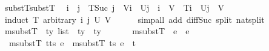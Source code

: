 \begin{isabellebody}
\endisatagproof
{\isafoldproof}%
%
\isadelimproof
\isanewline
%
\endisadelimproof
\isanewline
{}\isamarkupfalse%
\ substT{\isacharunderscore}{\kern0pt}substT{\isacharcolon}{\kern0pt}\isanewline
\ \ {\isachardoublequoteopen}i\ {\isasymle}\ j\ {\isasymLongrightarrow}\ T{\isacharbrackleft}{\kern0pt}Suc\ j\ {\isasymmapsto}\isactrlsub {\isasymtau}\ V{\isacharbrackright}{\kern0pt}\isactrlsub {\isasymtau}{\isacharbrackleft}{\kern0pt}i\ {\isasymmapsto}\isactrlsub {\isasymtau}\ U{\isacharbrackleft}{\kern0pt}j\ {\isacharminus}{\kern0pt}\ i\ {\isasymmapsto}\isactrlsub {\isasymtau}\ V{\isacharbrackright}{\kern0pt}\isactrlsub {\isasymtau}{\isacharbrackright}{\kern0pt}\isactrlsub {\isasymtau}\ {\isacharequal}{\kern0pt}\ T{\isacharbrackleft}{\kern0pt}i\ {\isasymmapsto}\isactrlsub {\isasymtau}\ U{\isacharbrackright}{\kern0pt}\isactrlsub {\isasymtau}{\isacharbrackleft}{\kern0pt}j\ {\isasymmapsto}\isactrlsub {\isasymtau}\ V{\isacharbrackright}{\kern0pt}\isactrlsub {\isasymtau}{\isachardoublequoteclose}\isanewline
%
\isadelimproof
\ \ %
\endisadelimproof
%
\isatagproof
{}\isamarkupfalse%
\ {\isacharparenleft}{\kern0pt}induct\ T\ arbitrary{\isacharcolon}{\kern0pt}\ i\ j\ U\ V{\isacharparenright}{\kern0pt}\isanewline
\ \ \ \ \isamarkupfalse%
\ {\isacharparenleft}{\kern0pt}simp{\isacharunderscore}{\kern0pt}all\ add{\isacharcolon}{\kern0pt}\ diff{\isacharunderscore}{\kern0pt}Suc\ split{\isacharcolon}{\kern0pt}\ nat{\isachardot}{\kern0pt}split{\isacharparenright}{\kern0pt}\isanewline
\ \ \isamarkupfalse%
%
\endisatagproof
{\isafoldproof}%
%
\isadelimproof
\ \isanewline
%
\endisadelimproof
\isanewline
\isanewline
\isanewline
{}\isamarkupfalse%
\ msubstT\ {\isacharcolon}{\kern0pt}{\isacharcolon}{\kern0pt}\ {\isachardoublequoteopen}ty\ list\ {\isasymRightarrow}\ ty\ {\isasymRightarrow}\ ty{\isachardoublequoteclose}\ \isanewline
\ \ \isanewline
\ \ \ {\isachardoublequoteopen}msubstT\ {\isacharbrackleft}{\kern0pt}{\isacharbrackright}{\kern0pt}\ e\ {\isacharequal}{\kern0pt}\ e{\isachardoublequoteclose}\isanewline
\ {\isacharbar}{\kern0pt}\ {\isachardoublequoteopen}msubstT\ {\isacharparenleft}{\kern0pt}t{\isacharhash}{\kern0pt}ts{\isacharparenright}{\kern0pt}\ e\ {\isacharequal}{\kern0pt}\ msubstT\ ts\ {\isacharparenleft}{\kern0pt}e{\isacharbrackleft}{\kern0pt}{}\ {\isasymmapsto}\isactrlsub {\isasymtau}\ t{\isacharbrackright}{\kern0pt}\isactrlsub {\isasymtau}{\isacharparenright}{\kern0pt}{\isachardoublequoteclose}\isanewline
\isanewline
\ \isanewline
{}\isamarkupfalse%

\end{isabellebody}
